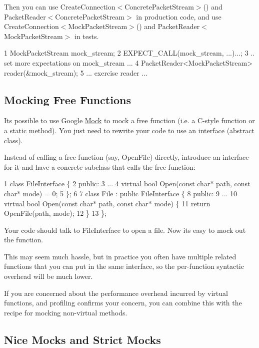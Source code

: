 Then you can use {\ttfamily Create\+Connection$<$Concrete\+Packet\+Stream$>$()} and {\ttfamily Packet\+Reader$<$Concrete\+Packet\+Stream$>$} in production code, and use {\ttfamily Create\+Connection$<$Mock\+Packet\+Stream$>$()} and {\ttfamily Packet\+Reader$<$Mock\+Packet\+Stream$>$} in tests.


\begin{DoxyCode}
1 MockPacketStream mock\_stream;
2 EXPECT\_CALL(mock\_stream, ...)...;
3 .. set more expectations on mock\_stream ...
4 PacketReader<MockPacketStream> reader(&mock\_stream);
5 ... exercise reader ...
\end{DoxyCode}


\subsection*{Mocking Free Functions}

It\textquotesingle{}s possible to use Google \hyperlink{classMock}{Mock} to mock a free function (i.\+e. a C-\/style function or a static method). You just need to rewrite your code to use an interface (abstract class).

Instead of calling a free function (say, {\ttfamily Open\+File}) directly, introduce an interface for it and have a concrete subclass that calls the free function\+:


\begin{DoxyCode}
1 class FileInterface \{
2  public:
3   ...
4   virtual bool Open(const char* path, const char* mode) = 0;
5 \};
6 
7 class File : public FileInterface \{
8  public:
9   ...
10   virtual bool Open(const char* path, const char* mode) \{
11     return OpenFile(path, mode);
12   \}
13 \};
\end{DoxyCode}


Your code should talk to {\ttfamily File\+Interface} to open a file. Now it\textquotesingle{}s easy to mock out the function.

This may seem much hassle, but in practice you often have multiple related functions that you can put in the same interface, so the per-\/function syntactic overhead will be much lower.

If you are concerned about the performance overhead incurred by virtual functions, and profiling confirms your concern, you can combine this with the recipe for mocking non-\/virtual methods.

\subsection*{Nice Mocks and Strict Mocks}

